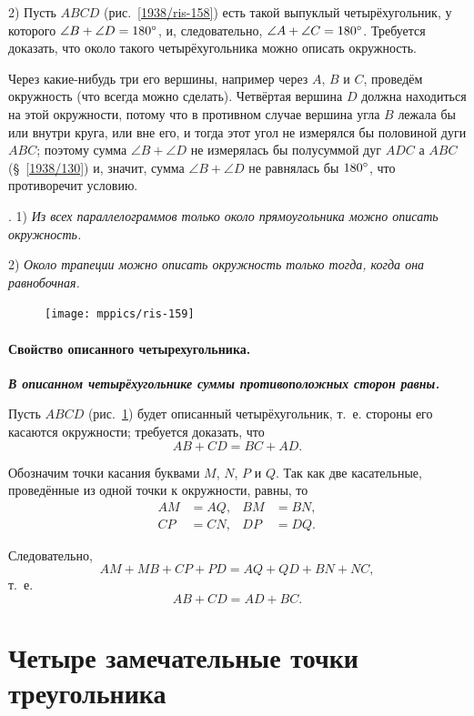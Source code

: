 \documentclass[oneside]{book}
\begin{document}
2) Пусть $ABCD$ (рис.~\ref{1938/ris-158}) есть такой выпуклый четырёхугольник, у которого $\angle B+\angle D = 180\degree$, и, следовательно, $\angle A + \angle C =180\degree$.
Требуется доказать, что около такого четырёхугольника можно описать окружность.

Через какие-нибудь три его вершины, например через $A$, $B$ и $C$, проведём окружность (что всегда можно сделать).
Четвёртая вершина $D$ должна находиться на этой окружности, потому что в противном случае вершина угла $B$ лежала бы или внутри круга, или вне его, и тогда этот угол не измерялся бы половиной дуги $ABC$;
поэтому сумма $\angle B+\angle D$ не измерялась бы полусуммой дуг $ADC$ а $ABC$ (§~\ref{1938/130}) и, значит, сумма $\angle B+\angle D$ не равнялась бы $180\degree$, что противоречит условию.

.
1) \emph{Из всех параллелограммов только около прямоугольника можно описать окружность.}

2) \emph{Около трапеции можно описать окружность только тогда, когда она равнобочная.}

\begin{figure}
\vskip-7mm
\centering
\texttt{[image: mppics/ris-159]}
\caption{}\label{1938/ris-159}
\end{figure}

\paragraph{Свойство описанного четырехугольника.}\label{1938/140}
\textbf{\emph{В описанном четырёхугольнике суммы противоположных сторон равны.}}

Пусть $ABCD$ (рис.~\ref{1938/ris-159}) будет описанный четырёхугольник, т.~е. стороны его касаются окружности;
требуется доказать, что 
\[AB+CD=BC+AD.\]


Обозначим точки касания буквами $M$, $N$, $P$ и $Q$.
Так как две касательные, проведённые из одной точки к окружности, равны, то 
\begin{align*}
AM&=AQ,& BM&=BN,
\\
CP&=CN, & DP &= DQ.
\end{align*}



Следовательно,
\[AM+MB+CP+PD = AQ + QD+BN+NC,\]
т.~е. 
\[AB+CD=AD+BC.\]


\section{Четыре замечательные точки треугольника}
\end{document}
